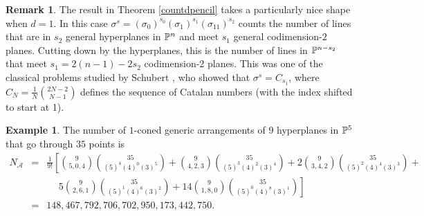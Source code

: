\documentclass[12pt]{article}
\theoremstyle{plain}
\theoremstyle{definition}
\newtheorem{example}[theorem]{Example}
\newtheorem{remark}[theorem]{Remark}
\newcommand{\A}{\mathcal{A}}
\renewcommand{\P}{\ensuremath \mathbb{P}}
\begin{document}
\begin{remark}
  The result in Theorem \ref{countdpencil} takes a particularly nice
  shape when $d=1$. In this case $\sigma^{s} = (\sigma_0)^{s_0}
  (\sigma_1)^{s_1} (\sigma_{11})^{s_2}$ counts the number of lines
  that are in $s_2$ general hyperplanes in $\P^n$ and meet $s_1$
  general codimension-$2$ planes. Cutting down by the hyperplanes,
  this is the number of lines in $\P^{n-s_2}$ that meet $s_1 =
  2(n-1)-2s_2$ codimension-$2$ planes. This was one of the classical
  problems studied by Schubert \cite{Schubert}, who showed that
  $\sigma^s = C_{s_1}$, where $C_N = \frac{1}{N}\binom{2N-2}{N-1}$
  defines the sequence of Catalan numbers (with the index shifted to
  start at 1).
\end{remark}

\begin{example} 
The number of $1$-coned generic arrangements of $9$ hyperplanes in $\P^5$ that go through $35$ points is 
$$ \begin{array}{lll} N_\A & = & \frac{1}{9!} \left[
  \binom{9}{5,0,4}\binom{35}{(5)^4(4)^0(3)^5} +
  \binom{9}{4,2,3}\binom{35}{(5)^3(4)^2(3)^4} + 
2\binom{9}{3,4,2}\binom{35}{(5)^2(4)^4(3)^3} +\right. \\
& & \phantom{\frac{1}{9!} [[} \left. 5\binom{9}{2,6,1}\binom{35}{(5)^1(4)^6(3)^2} +  
14\binom{9}{1,8,0}\binom{35}{(5)^0(4)^8(3)^1}  \right] \\
& = & 148,467,792,706,702,950,173,442,750.
\end{array} $$
\end{example}
\end{document}

